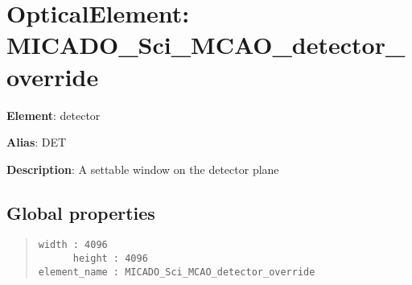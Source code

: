 

\section{OpticalElement: \textquotedbl{}MICADO\_Sci\_MCAO\_detector\_override\textquotedbl{}%
  \label{opticalelement-micado-sci-mcao-detector-override}%
}

\textbf{Element}: detector

\textbf{Alias}: DET

\textbf{Description}: A settable window on the detector plane


\subsection{Global properties%
  \label{global-properties}%
}

\begin{quote}
\begin{alltt}
\begin{lstlisting}[frame=single]
       width : 4096
      height : 4096
element_name : MICADO_Sci_MCAO_detector_override
\end{lstlisting}
\end{alltt}
\end{quote}
